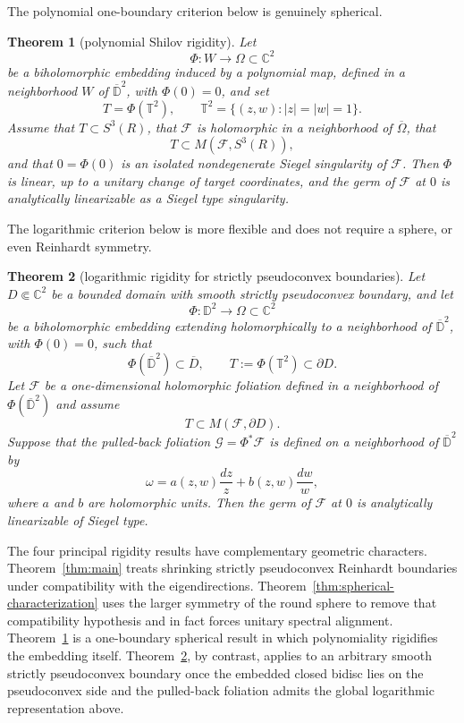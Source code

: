 \documentclass[11pt,reqno]{article}
\newtheorem{theorem}{Theorem}
\theoremstyle{remark}
\newcommand{\C}{\mathbb C}
\newcommand{\D}{\mathbb D}
\newcommand{\F}{\mathcal F}
\newcommand{\G}{\mathcal G}
\newcommand{\Om}{\Omega}
\newcommand{\T}{\mathbb T}
\newcommand{\ol}{\overline}
\begin{document}
The polynomial one-boundary criterion below is genuinely spherical. 

\begin{theorem}[polynomial Shilov rigidity]\label{thm:polynomial}
Let 
\[
 \Phi: W \longrightarrow \Om\subset\C^2
\]
be a biholomorphic embedding induced by a polynomial map, defined in a neighborhood $W$ of $\ol{\D}^2$, with $\Phi(0)=0$, and set
\[
 T=\Phi(\T^2),\qquad \T^2=\{(z,w):|z|=|w|=1\}.
\]
Assume that $T\subset S^3(R)$, that $\F$ is holomorphic in a neighborhood of $\ol\Om$, that
\[
 T\subset M(\F,S^3(R)),
\]
and that $0=\Phi(0)$ is an isolated nondegenerate Siegel singularity of $\F$.
 Then $\Phi$ is linear, up to a unitary change of target coordinates, and the germ of $\F$ at $0$ is analytically linearizable as a Siegel type singularity.
\end{theorem}

The logarithmic criterion below is more flexible and does not require a sphere, or even Reinhardt symmetry. 

\begin{theorem}[logarithmic rigidity for strictly pseudoconvex boundaries]\label{thm:logarithmic}
Let $D\Subset\C^2$ be a bounded domain with smooth strictly pseudoconvex boundary, and let
\[
 \Phi:\D^2\longrightarrow \Om\subset\C^2
\]
be a biholomorphic embedding extending holomorphically to a neighborhood of $\ol{\D}^2$, with $\Phi(0)=0$, such that
\[
 \Phi(\ol{\D}^2)\subset\ol D,
 \qquad
 T:=\Phi(\T^2)\subset\partial D.
\]
Let $\F$ be a one-dimensional holomorphic foliation defined in a neighborhood of $\Phi(\ol{\D}^2)$ and assume
\[
 T\subset M(\F,\partial D).
\]
Suppose that the pulled-back foliation $\G=\Phi^*\F$ is defined on a neighborhood of $\ol{\D}^2$ by
\[
 \omega=a(z,w)\frac{dz}{z}+b(z,w)\frac{dw}{w},
\]
where $a$ and $b$ are holomorphic units. Then the germ of $\F$ at $0$ is analytically linearizable of Siegel type.
\end{theorem}

The four principal rigidity results have complementary geometric characters. Theorem~\ref{thm:main} treats shrinking strictly pseudoconvex Reinhardt boundaries under compatibility with the eigendirections. Theorem~\ref{thm:spherical-characterization} uses the larger symmetry of the round sphere to remove that compatibility hypothesis and in fact forces unitary spectral alignment. Theorem~\ref{thm:polynomial} is a one-boundary spherical result in which polynomiality rigidifies the embedding itself. Theorem~\ref{thm:logarithmic}, by contrast, applies to an arbitrary smooth strictly pseudoconvex boundary once the embedded closed bidisc lies on the pseudoconvex side and the pulled-back foliation admits the global logarithmic representation above.
\end{document}
